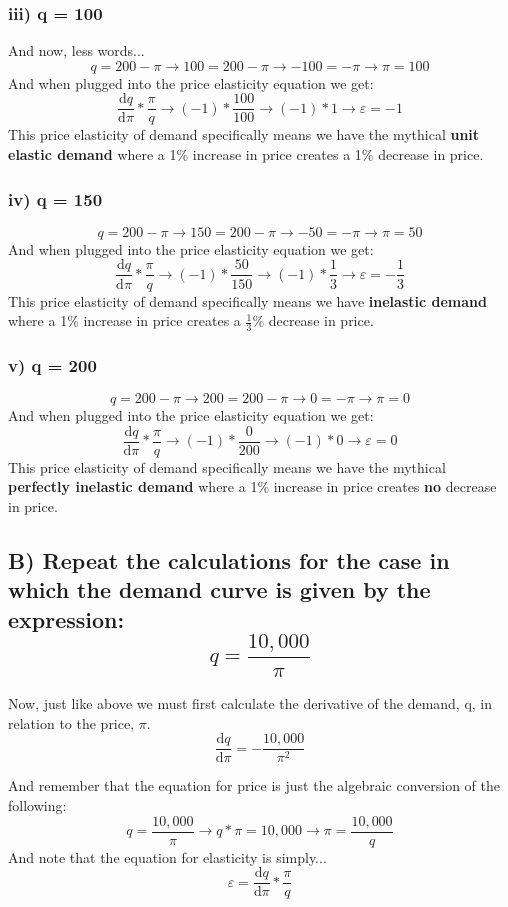 \documentclass{article}
\begin{document}
\subsubsection{iii) q = 100}
And now, less words...
$$ q = 200 - \pi \rightarrow 100 = 200 - \pi \rightarrow -100 = -\pi \rightarrow \pi = 100 $$
And when plugged into the price elasticity equation we get:
$$ \frac{\text{d}q}{\text{d}\pi}*\frac{\pi}{q} \rightarrow (-1)*\frac{100}{100} \rightarrow (-1)*1 \rightarrow \varepsilon = -1 $$
This price elasticity of demand specifically means we have the mythical \textbf{unit elastic demand} where a 1\% increase in price creates a 1\% decrease in price.

\subsubsection{iv) q = 150}
$$ q = 200 - \pi \rightarrow 150 = 200 - \pi \rightarrow -50 = -\pi \rightarrow \pi = 50 $$
And when plugged into the price elasticity equation we get:
$$ \frac{\text{d}q}{\text{d}\pi}*\frac{\pi}{q} \rightarrow (-1)*\frac{50}{150} \rightarrow (-1)*\frac{1}{3} \rightarrow \varepsilon = -\frac{1}{3} $$
This price elasticity of demand specifically means we have \textbf{inelastic demand} where a 1\% increase in price creates a $\frac{1}{3}$\% decrease in price.

\subsubsection{v) q = 200}
$$ q = 200 - \pi \rightarrow 200 = 200 - \pi \rightarrow 0 = -\pi \rightarrow \pi = 0 $$
And when plugged into the price elasticity equation we get:
$$ \frac{\text{d}q}{\text{d}\pi}*\frac{\pi}{q} \rightarrow (-1)*\frac{0}{200} \rightarrow (-1)*0 \rightarrow \varepsilon = 0 $$
This price elasticity of demand specifically means we have the mythical \textbf{perfectly inelastic demand} where a 1\% increase in price creates \textbf{no} decrease in price.
\pagebreak

\subsection{B) Repeat the calculations for the case in which the demand curve is given by the expression: $$ q = \frac{10,000}{\pi} $$}
Now, just like above we must first calculate the derivative of the demand, q, in relation to the price, $\pi$.
$$ \frac{\text{d}q}{\text{d}\pi} = -\frac{10,000}{\pi^2}$$

And remember that the equation for price is just the algebraic conversion of the following:
$$ q = \frac{10,000}{\pi} \rightarrow q*\pi = 10,000 \rightarrow \pi = \frac{10,000}{q} $$
And note that the equation for elasticity is simply...
$$ \varepsilon = \frac{\text{d}q}{\text{d}\pi}*\frac{\pi}{q} $$
\end{document}
